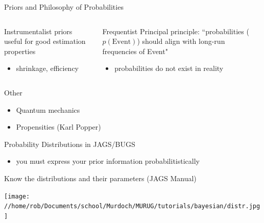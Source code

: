 \documentclass[presentation,9pt,xcolor=dvipsnames]{beamer}
\begin{document}
\begin{frame}[label={sec:orgdc9a1ea}]{Priors and Philosophy of Probabilities}
\begin{columns}
\begin{column}{0.4\columnwidth}
\begin{block}{Instrumentalist}
priors useful for good estimation properties
\begin{itemize}
\item shrinkage, efficiency
\end{itemize}
\end{block}
\end{column}
\begin{column}{0.6\columnwidth}
\begin{block}{Frequentist}
Principal principle: ``probabilities (\(p(\text{Event})\)) should align with long-run frequencies of Event"
\begin{itemize}
\item probabilities do not exist in reality
\end{itemize}
\end{block}
\end{column}
\end{columns}
\begin{block}{Other}
\begin{itemize}
\item Quantum mechanics
\item Propensities (Karl Popper)
\end{itemize}
\end{block}
\end{frame}
\begin{frame}[label={sec:orgceb18b9}]{Probability Distributions in JAGS/BUGS}
\begin{itemize}
\item you must express your prior information \alert{probabilitistically}
\end{itemize}
\begin{block}{Know the distributions and their parameters (JAGS Manual)}
\begin{center}
\texttt{[image: //home/rob/Documents/school/Murdoch/MURUG/tutorials/bayesian/distr.jpg]}
\end{center}
\end{block}
\end{frame}
\end{document}
